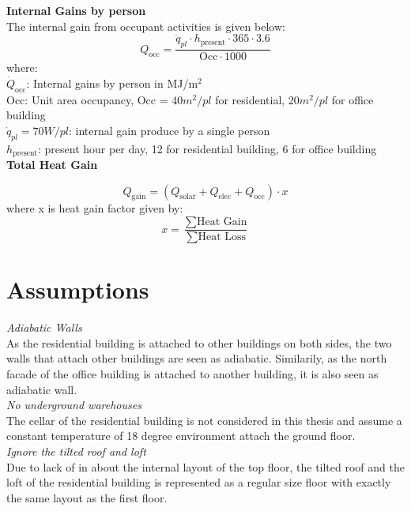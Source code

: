 \documentclass[a4paper, oneside]{discothesis}
\begin{document}
			\textbf{Internal Gains by person}\\
			The internal gain from occupant activities is given below:\\

			\[Q_{\text{occ}} = \frac{\dot{q}_{pl} \cdot h_{\text{present}} \cdot 365 \cdot 3.6}{\text{Occ} \cdot  1000}\]
			where:\\
			$\dot{Q}_{\text{occ}}$: Internal gains by person in MJ/m$^2$\\
			$\text{Occ}$: Unit area occupancy, Occ = 40$m^2/pl$ for residential, 20$m^2/pl$ for office building\\
			$\dot{q}_{pl} = 70W/pl$: internal gain produce by a single person\\
			$h_{\text{present}}$: present hour per day, 12 for residential building, 6 for office building\\



			\textbf{Total Heat Gain}

			\[Q_{\text{gain}} = (Q_{\text{solar}} + Q_{\text{elec}} + Q_{\text{occ}}) \cdot x\]
			where x is heat gain factor given by:
			\[ x = \frac{\sum \text{Heat Gain}}{\sum \text{Heat Loss}}\]

\chapter{Assumptions}\label{sec:assumptions}

	\textit{Adiabatic Walls}\\
	As the residential building is attached to other buildings on both sides, the two walls that attach other buildings are seen as adiabatic. Similarily, as the north facade of the office building is attached to another building, it is also seen as adiabatic wall.\\

	\textit{No underground warehouses}\\
	The cellar of the residential building is not considered in this thesis and assume a constant temperature of 18 degree environment attach the ground floor.\\

	\textit{Ignore the tilted roof and loft}\\
	Due to lack of in about the internal layout of the top floor, the tilted roof and the loft of the residential building is represented as a regular size floor with exactly the same layout as the first floor.\\
\end{document}
